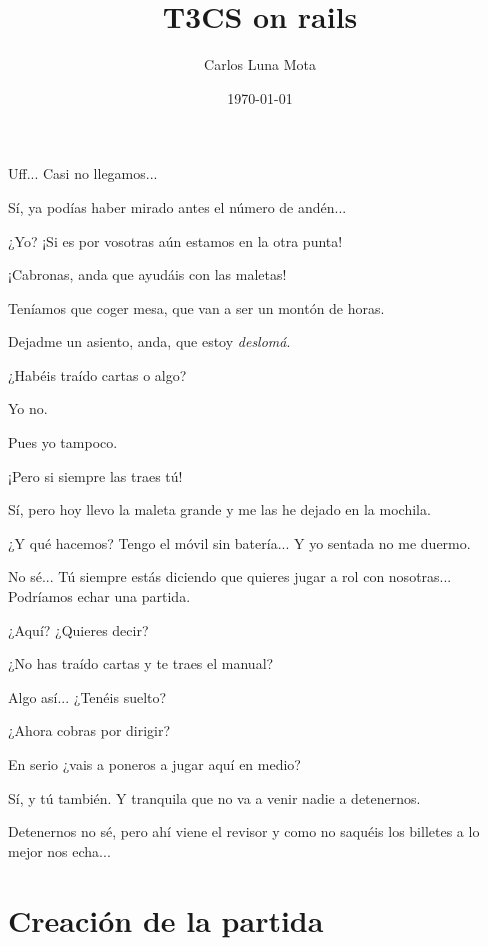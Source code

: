 \documentclass[10pt, a5paper, twocolumn]{article}
\title{T3CS on rails}
\author{Carlos Luna Mota}
\date{\today}
\newenvironment{dialogue}
    {\begin{description}[leftmargin=!,align=right,labelwidth=0.cm]}
    {\end{description}}
\newcommand\A{\item[\raisebox{-0.25em}{\scalebox{0.75}{\bctetraedre}}]}
\newcommand\B{\item[\raisebox{-0.25em}{\scalebox{0.75}{\bccube}}]}
\newcommand\E{\item[\raisebox{-0.25em}{\scalebox{0.75}{\bcicosaedre}}]}
\begin{document}
    \maketitle %

    \begin{dialogue}
        \A Uff... Casi no llegamos...
        \B Sí, ya podías haber mirado antes el número de andén...
        \A ¿Yo? ¡Si es por vosotras aún estamos en la otra punta!
        \E ¡Cabronas, anda que ayudáis con las maletas!
        \A Teníamos que coger mesa, que van a ser un montón de horas.
        \E Dejadme un asiento, anda, que estoy \emph{deslomá}.
        \A ¿Habéis traído cartas o algo?
        \B Yo no.
        \E Pues yo tampoco.
        \B ¡Pero si siempre las traes tú!
        \E Sí, pero hoy llevo la maleta grande y me las he dejado en la mochila.
        \A ¿Y qué hacemos? Tengo el móvil sin batería... Y yo sentada no me duermo.
        \E No sé... Tú siempre estás diciendo que quieres jugar a rol con nosotras... Podríamos echar una partida.
        \A ¿Aquí? ¿Quieres decir?
        \B ¿No has traído cartas y te traes el manual?
        \E Algo así... ¿Tenéis suelto?
        \B ¿Ahora cobras por dirigir?
        \A En serio ¿vais a poneros a jugar aquí en medio?
        \E Sí, y tú también. Y tranquila que no va a venir nadie a detenernos.
        \B Detenernos no sé, pero ahí viene el revisor y como no saquéis los billetes a lo mejor nos echa...
    \end{dialogue}

    \section*{Creación de la partida} %
\end{document}
